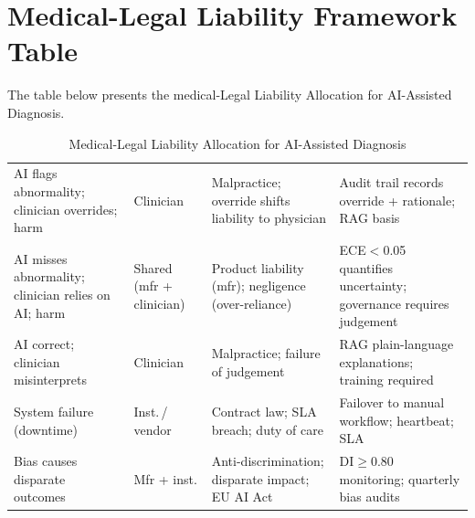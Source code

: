 \section*{Medical-Legal Liability Framework Table}
\label{sec:app_ch5_tab_liability_framework_app}
\noindent The table below presents the medical-Legal Liability Allocation for AI-Assisted Diagnosis.

\begin{table}[H]
\tablestripes
\caption[Medical-Legal Liability Framework]{Medical-Legal Liability Allocation for AI-Assisted Diagnosis}
\begin{tabularx}{\textwidth}{@{} >{\raggedright\arraybackslash}p{3.6cm} >{\raggedright\arraybackslash}p{2.4cm} L L @{}}
\toprule
{} &  &  &  \\
\midrule
AI flags abnormality; clinician overrides; harm & Clinician & Malpractice; override shifts liability to physician & Audit trail records override + rationale; RAG basis \\
\addlinespace
AI misses abnormality; clinician relies on AI; harm & Shared (mfr + clinician) & Product liability (mfr); negligence (over-reliance) & ECE$<$0.05 quantifies uncertainty; governance requires judgement \\
\addlinespace
AI correct; clinician misinterprets & Clinician & Malpractice; failure of judgement & RAG plain-language explanations; training required \\
\addlinespace
System failure (downtime) & Inst.\,/\,vendor & Contract law; SLA breach; duty of care & Failover to manual workflow; heartbeat; SLA \\
\addlinespace
Bias causes disparate outcomes & Mfr + inst. & Anti-discrimination; disparate impact; EU AI Act & DI$\geq$0.80 monitoring; quarterly bias audits \\
\bottomrule
\end{tabularx}
\end{table}


